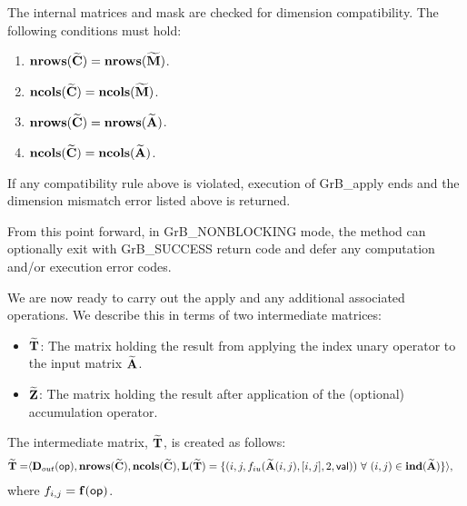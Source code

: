 The internal matrices and mask are checked for dimension compatibility. 
The following conditions must hold:
\begin{enumerate}
    \item $\bold{nrows}({\bf \widetilde{C}}) = \bold{nrows}({\bf \widetilde{M}})$.

    \item $\bold{ncols}({\bf \widetilde{C}}) = \bold{ncols}({\bf \widetilde{M}})$.

    \item $\bold{nrows}({\bf \widetilde{C}}) = \bold{nrows}({\bf \widetilde{A}})$.

    \item $\bold{ncols}({\bf \widetilde{C}}) = \bold{ncols}({\bf \widetilde{A}})$.
\end{enumerate}
If any compatibility rule above is violated, execution of {\sf GrB\_apply} ends and 
the dimension mismatch error listed above is returned.

From this point forward, in {\sf GrB\_NONBLOCKING} mode, the method can optionally exit
with {\sf GrB\_SUCCESS} return code and defer any computation and/or execution error codes.

We are now ready to carry out the apply and any additional 
associated operations.  We describe this in terms of two intermediate matrices:
\begin{itemize}
    \item ${\bf \widetilde{T}}$: The matrix holding the result from applying the index unary operator to the input matrix
    ${\bf \widetilde{A}}$.

    \item ${\bf \widetilde{Z}}$: The matrix holding the result after 
    application of the (optional) accumulation operator.
\end{itemize}

{\color{red}
The intermediate matrix, ${\bf \widetilde{T}}$, is created as follows:
\[
\begin{aligned}
{\bf \widetilde{T}} = & \langle \mbox{$\mathbf{D}_{out}$}({\sf op}),
                           \bold{nrows}({\bf \widetilde{C}}), 
                           \bold{ncols}({\bf \widetilde{C}}),  \bold{L}({\bf \widetilde{T}}) =
    \{(i,j,f_{iu}({\bf \widetilde{A}}(i,j),[i,j],2,{\sf val})) 
\ \forall \ (i,j) \in 
\bold{ind}({\bf \widetilde{A}}) \} \rangle,
\end{aligned}
\]
where $f_{i,j} = \mathbf{f}({\sf op})$.
}





